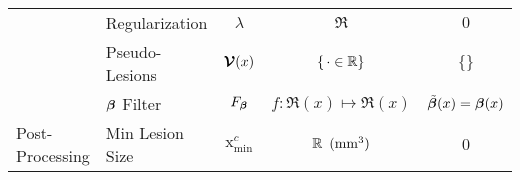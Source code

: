 \begin{table}
\begin{tabular}{llccc}
  	                                 & Regularization         &         $\lambda$         &           $\Re$            &            $0$            \\
  	                                 & Pseudo-Lesions         &         $\bm{\mathcal{V}}(x)$          &    $\{\thinspace\cdot\in\mathbb{R}\}$    &          $\{\}$           \\
  	                                 & $\bm{\beta}$ Filter           &         $F_{\bm{\beta}}$         & $f: \Re(x) \mapsto \Re(x)$ & $\tilde{\bm{\beta}}(x) = \bm{\beta}(x)$ \\ \midrule
  	\multirow{1}{*}{Post-Processing} & Min Lesion  Size       &  $\mathrm{x}_{\min}^{c}$  &  $\mathbb{R}\enspace(\text{\si{\milli\metre\cubed}})$   & $0$      \\ \bottomrule
  \end{tabular}
\end{table}
